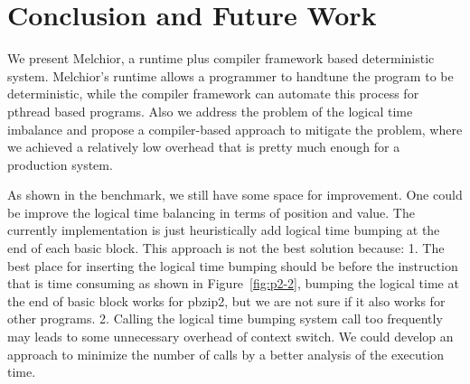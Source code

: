 \documentclass{sig-alternate}
\begin{document}
\section{Conclusion and Future Work}
We present Melchior, a runtime plus compiler framework based deterministic system. Melchior's runtime allows a programmer to handtune the program to be deterministic, while the compiler framework can automate this process for pthread based programs. Also we address the problem of the logical time imbalance and propose a compiler-based approach to mitigate the problem, where we achieved a relatively low overhead that is pretty much enough for a production system.

As shown in the benchmark, we still have some space for improvement. One could be improve the logical time balancing in terms of position and value. The currently implementation is just heuristically add logical time bumping at the end of each basic block. This approach is not the best solution because: 1. The best place for inserting the logical time bumping should be before the instruction that is time consuming as shown in Figure~\ref{fig:p2-2}, bumping the logical time at the end of basic block works for pbzip2, but we are not sure if it also works for other programs. 2. Calling the logical time bumping system call too frequently may leads to some unnecessary overhead of context switch. We could develop an approach to minimize the number of calls by a better analysis of the execution time.


\end{document}
